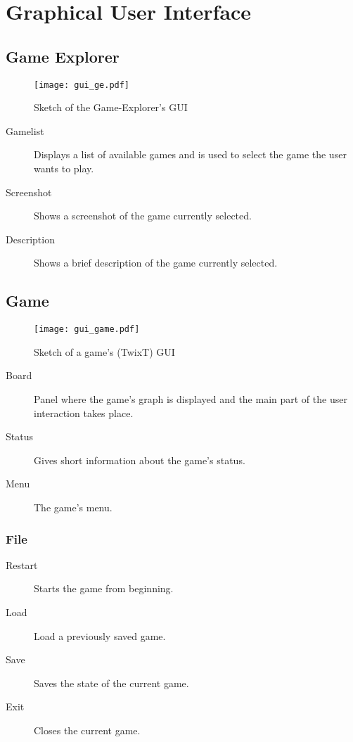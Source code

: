 \section{Graphical User Interface}
\subsection{Game Explorer}

\begin{figure}[h]
	\centering
	\texttt{[image: gui\_ge.pdf]}
	\caption{Sketch of the Game-Explorer's GUI}
	\label{img:GE_GUI}
\end{figure}

\begin{description}
	\item[Gamelist] Displays a list of available games and is used to select the game the user wants to play.
	\item[Screenshot] Shows a screenshot of the game currently selected.
	\item[Description] Shows a brief description of the game currently selected.
\end{description}

\subsection{Game} \label{REF:GUI_GAME}

\begin{figure}[H]
	\centering
	\texttt{[image: gui\_game.pdf]}
	\caption{Sketch of a game's (TwixT) GUI}
	\label{img:GAME_GUI}
\end{figure}

\begin{description}
	\item[Board] Panel where the game's graph is displayed and the main part of the user interaction takes place.
	\item[Status] Gives short information about the game's status.
	\item[Menu] The game's menu.
\end{description}

\subsubsection{File}
\begin{description}
	\item[Restart] Starts the game from beginning.
	\item[Load] Load a previously saved game.
	\item[Save] Saves the state of the current game.
	\item[Exit] Closes the current game.
\end{description}
